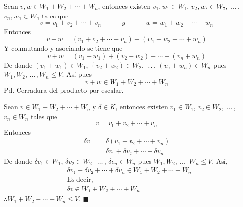 \documentclass[fleqn]{article}                       %
\begin{document}
\begin{enumerate}
\begin{enumerate}
            Sean $ v, w \in W_1 + W_2 + \cdots + W_n $, entonces existen $ v_1, w_1 \in W_1 $, $ v_2, w_2 \in W_2 $, $ \, \ldots \, $, $ v_n, w_n \in W_n $ tales que
            \begin{equation*}
                v = v_1 + v_2 + \cdots + v_n \quad \quad \quad y \quad \quad \quad
                w = w_1 + w_2 + \cdots + w_n
            \end{equation*}
            Entonces
            \begin{equation*}
                v + w = \left( v_1 + v_2 + \cdots + v_n \right) + \left( w_1 + w_2 + \cdots + w_n \right)
            \end{equation*}
            Y conmutando y asociando se tiene que 
            \begin{equation*}
                v + w = \left( v_1 + w_1 \right) + \left( v_2 + w_2 \right) + \cdots + \left( v_n + w_n \right)
            \end{equation*}
            De donde $ \left( v_1 + w_1 \right) \in W_1 $, $ \left( v_2 + w_2 \right) \in W_2 $, $ \, \ldots \, $, $ \left( v_n + w_n \right) \in W_n $ pues $ W_1, W_2, \, \ldots \, , W_n \leq V $. Así pues
            \begin{equation*}
                v + w \in W_1 + W_2 + \cdots + W_n
            \end{equation*}
            Pd. Cerradura del producto por escalar. \par
            Sean $ v \in W_1 + W_2 + \cdots + W_n $ y $ \delta \in K $, entonces existen $ v_1 \in W_1 $, $ v_2 \in W_2 $, $ \, \ldots \, $, $ v_n \in W_n $ tales que
            \begin{equation*}
                v = v_1 + v_2 + \cdots + v_n
            \end{equation*}
            Entonces
            \begin{align*}
                \delta v =& \, \delta \left( v_1 + v_2 + \cdots + v_n \right) \\
                =& \, \delta v_1 + \delta v_2 + \cdots + \delta v_n 
            \end{align*}
            De donde $ \delta v_1 \in W_1 $, $ \delta v_2 \in W_2 $, $ \, \ldots \, $, $ \delta v_n \in W_n $ pues $ W_1, W_2, \, \ldots \, , W_n \leq V $. Así,
            \begin{align*}
                & \delta v_1 + \delta v_2 + \cdots + \delta v_n \in W_1 + W_2 + \cdots + W_n \\
                & \text{Es decir,} \\
                & \delta v \in W_1 + W_2 + \cdots + W_n
            \end{align*}
            $ \therefore W_1 + W_2 + \cdots + W_n \leq V $. $\blacksquare$


\end{enumerate}
\end{enumerate}
\end{document}
